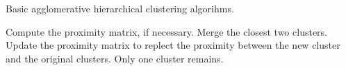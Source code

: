 \begin{algorithm}
	\caption{Basic agglomerative hierarchical clustering algorihms.}\label{alg:agglomerative}
	\begin{algorithmic}[1]
			\State Compute the proximity matrix, if necessary.
			\Repeat
				\State Merge the closest two clusters.
				\State Update the proximity matrix to replect the proximity between the new cluster and the original clusters.
			\Until Only one cluster remains.
	\end{algorithmic}
\end{algorithm}